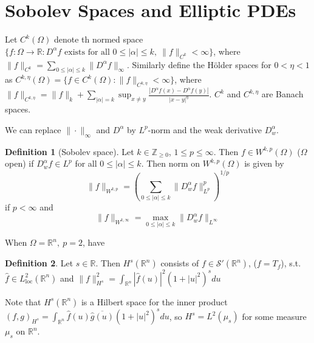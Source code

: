 \documentclass{article}
\theoremstyle{definition}
\newtheorem{defn}{Definition}[section]
\theoremstyle{remark}
\theoremstyle{plain}
\newcommand{\ZZ}{\mathbb{Z}}
\newcommand{\RR}{\mathbb{R}}
\begin{document}
\section{Sobolev Spaces and Elliptic PDEs}
Let $C^k(\Omega)$ denote th normed space $\{f:\Omega\to\RR:D^\alpha f\text{ exists for all }0\le |\alpha|\le k,\ \|f\|_{C^k}<\infty\}$, where $\|f\|_{C^k}=\sum_{0\le|\alpha|\le k}\|D^\alpha f\|_\infty$. Similarly define the H\"older spaces for $0<\eta<1$ as $C^{k,\eta}(\Omega)=\{f\in C^{k}(\Omega):\|f\|_{C^{k,\eta}}<\infty\}$, where $\|f\|_{C^{k,\eta}}=\|f\|_k+\sum_{|\alpha|=k}\sup_{x\neq y}\frac{|D^\alpha f(x)-D^\alpha f(y)|}{|x-y|^\eta}$.
$C^k$ and $C^{k,\eta}$ are Banach spaces.

We can replace $\|\cdot\|_\infty$ and $D^\alpha$ by $L^p$-norm and the weak derivative $D^\alpha_w$.

\begin{defn}[Sobolev space]
    Let $k\in\ZZ_{\ge0}$, $1\le p\le\infty$. Then $f\in W^{k,p}(\Omega)$ ($\Omega$ open) if $D_w^\alpha f\in L^p$ for all $0\le |\alpha|\le k$. Then norm on $W^{k,p}(\Omega)$ is given by
    \[\|f\|_{W^{k,p}}=\left(\sum_{0\le|\alpha|\le k}\|D_w^\alpha f\|_{L^p}^p\right)^{1/p}\] if $p<\infty$
    and \[\|f\|_{W^{k,\infty}}=\max_{0\le|\alpha|\le k}\|D_w^\alpha f\|_{L^\infty}\]
\end{defn}
When $\Omega=\RR^n,\ p=2$, have
\begin{defn}
    Let $s\in\RR$. Then $H^s(\RR^n)$ consists of $f\in\mathcal S'(\RR^n)$, ($f=T_f$), s.t. $\hat f\in L^2_{\text{loc}}(\RR^n)$ and $\|f\|_{H^s}^2=\int_{\RR^n}|\hat f(u)|^2(1+|u|^2)^sdu$
\end{defn}
Note that $H^s(\RR^n)$ is a Hilbert space for the inner product $(f,g)_{H^s}=\int_{\RR^n}\hat f(u)\overline{\hat g(u)}(1+|u|^2)^sdu$, so $H^s=L^2(\mu_s)$ for some measure $\mu_s$ on $\RR^n$.
\end{document}
